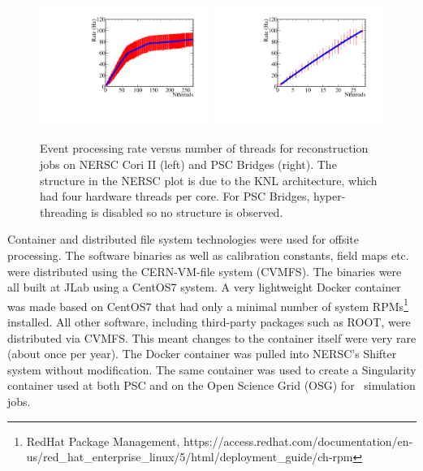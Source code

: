 \begin{figure}[htb]\centering
\includegraphics[width=0.49\textwidth]{figures/production_offsite_rate_vs_nthreads_NERSC.pdf}
\includegraphics[width=0.49\textwidth]{figures/production_offsite_rate_vs_nthreads_PSC.pdf}
\caption[]{\label{fig:production_offsite_rate_vs_nthreads_NERSC}Event processing rate versus number of threads for reconstruction jobs on NERSC Cori II (left) and PSC Bridges (right). The structure in the NERSC plot is due to the KNL architecture, which had four hardware threads per core. For PSC Bridges, hyper-threading is disabled so no structure is observed.} 
\end{figure}

Container and distributed file system technologies were used for offsite processing. The software binaries as well as calibration constants, field maps etc. were distributed using the CERN-VM-file system (CVMFS). 
The binaries were all built at JLab using a CentOS7 system. A very lightweight Docker container was made based on CentOS7 that had only a minimal number of system RPMs\footnote{RedHat Package Management, https://access.redhat.com/documentation/en-us/red\_hat\_enterprise\_linux/5/html/deployment\_guide/ch-rpm} installed. All other software, including third-party packages such as ROOT, were distributed via CVMFS. This meant changes to the container itself were very rare (about once per year). The Docker container was pulled into NERSC's Shifter system without modification. The same container was used to create a Singularity container used at both PSC and on the Open Science Grid (OSG) for \GX~simulation jobs.


